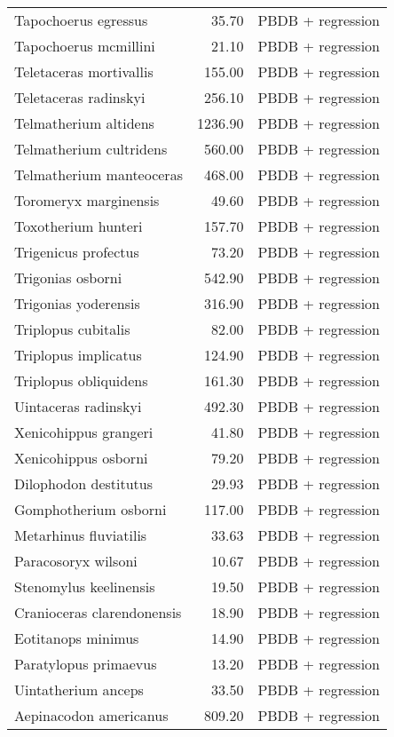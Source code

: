 \begin{table}[ht]
\begin{tabular}{lrl}
  Tapochoerus egressus & 35.70 & PBDB + regression \\ 
  Tapochoerus mcmillini & 21.10 & PBDB + regression \\ 
  Teletaceras mortivallis & 155.00 & PBDB + regression \\ 
  Teletaceras radinskyi & 256.10 & PBDB + regression \\ 
  Telmatherium altidens & 1236.90 & PBDB + regression \\ 
  Telmatherium cultridens & 560.00 & PBDB + regression \\ 
  Telmatherium manteoceras & 468.00 & PBDB + regression \\ 
  Toromeryx marginensis & 49.60 & PBDB + regression \\ 
  Toxotherium hunteri & 157.70 & PBDB + regression \\ 
  Trigenicus profectus & 73.20 & PBDB + regression \\ 
  Trigonias osborni & 542.90 & PBDB + regression \\ 
  Trigonias yoderensis & 316.90 & PBDB + regression \\ 
  Triplopus cubitalis & 82.00 & PBDB + regression \\ 
  Triplopus implicatus & 124.90 & PBDB + regression \\ 
  Triplopus obliquidens & 161.30 & PBDB + regression \\ 
  Uintaceras radinskyi & 492.30 & PBDB + regression \\ 
  Xenicohippus grangeri & 41.80 & PBDB + regression \\ 
  Xenicohippus osborni & 79.20 & PBDB + regression \\ 
  Dilophodon destitutus & 29.93 & PBDB + regression \\ 
  Gomphotherium osborni & 117.00 & PBDB + regression \\ 
  Metarhinus fluviatilis & 33.63 & PBDB + regression \\ 
  Paracosoryx wilsoni & 10.67 & PBDB + regression \\ 
  Stenomylus keelinensis & 19.50 & PBDB + regression \\ 
  Cranioceras clarendonensis & 18.90 & PBDB + regression \\ 
  Eotitanops minimus & 14.90 & PBDB + regression \\ 
  Paratylopus primaevus & 13.20 & PBDB + regression \\ 
  Uintatherium anceps & 33.50 & PBDB + regression \\ 
  Aepinacodon americanus & 809.20 & PBDB + regression \\ 

\end{tabular}
\end{table}
